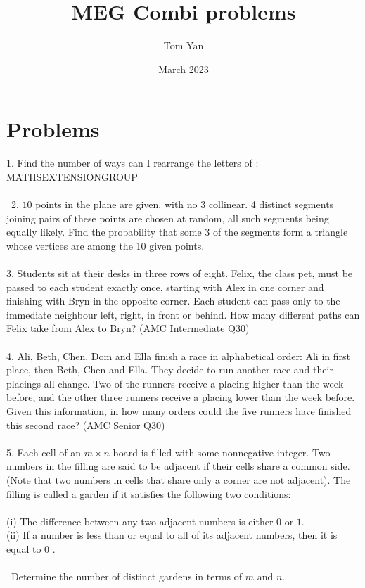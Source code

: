 \documentclass{article}
\title{MEG Combi problems}
\author{Tom Yan}
\date{March 2023}
\begin{document}
\section*{Problems}
1. Find the number of ways can I rearrange the letters of : MATHSEXTENSIONGROUP \\\\\
2. $10$ points in the plane are given, with no 3 collinear. 4 distinct segments joining pairs of these points are chosen at random, all such segments being equally likely. Find the probability that some 3 of the segments form a triangle whose vertices are among the 10 given points.\\\\
3. Students sit at their desks in three rows of eight. Felix, the class pet, must be passed to each student exactly once, starting with Alex in one corner and finishing with Bryn in the opposite corner. Each student can pass only to the immediate neighbour left, right, in front or behind. How many different paths can Felix take from Alex to Bryn? (AMC Intermediate Q30) \\\\
4. Ali, Beth, Chen, Dom and Ella finish a race in alphabetical order: Ali in first place, then Beth, Chen and Ella. They decide to run another race and their placings all change. Two of the runners receive a placing higher than the week before, and the other three runners receive a placing lower than the week before. Given this information, in how many orders could the five runners have finished this second race? (AMC Senior Q30) \\\\
5. Each cell of an $m\times n$ board is filled with some nonnegative integer. Two numbers in the filling are said to be adjacent if their cells share a common side. (Note that two numbers in cells that share only a corner are not adjacent). The filling is called a garden if it satisfies the following two conditions: \\\\(i) The difference between any two adjacent numbers is either $0$ or $1$. \\
(ii) If a number is less than or equal to all of its adjacent numbers, then it is equal to $0$ . \\\\\ Determine the number of distinct gardens in terms of $m$ and $n$. 
\end{document}
